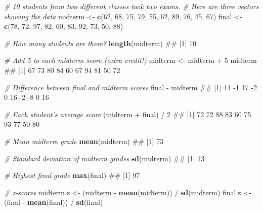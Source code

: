 \documentclass[]{book}
\newenvironment{Shaded}{\begin{snugshade}}{\end{snugshade}}
\newcommand{\KeywordTok}[1]{\textcolor[rgb]{0.13,0.29,0.53}{\textbf{{#1}}}}
\newcommand{\DecValTok}[1]{\textcolor[rgb]{0.00,0.00,0.81}{{#1}}}
\newcommand{\StringTok}[1]{\textcolor[rgb]{0.31,0.60,0.02}{{#1}}}
\newcommand{\CommentTok}[1]{\textcolor[rgb]{0.56,0.35,0.01}{\textit{{#1}}}}
\newcommand{\NormalTok}[1]{{#1}}
\theoremstyle{definition}
\theoremstyle{definition}
\theoremstyle{remark}
\begin{document}
\begin{Shaded}
\begin{Highlighting}[]
\CommentTok{# 10 students from two different classes took two exams.}
\CommentTok{#  Here are three vectors showing the data}
\NormalTok{midterm <-}\StringTok{ }\KeywordTok{c}\NormalTok{(}\DecValTok{62}\NormalTok{, }\DecValTok{68}\NormalTok{, }\DecValTok{75}\NormalTok{, }\DecValTok{79}\NormalTok{, }\DecValTok{55}\NormalTok{, }\DecValTok{62}\NormalTok{, }\DecValTok{89}\NormalTok{, }\DecValTok{76}\NormalTok{, }\DecValTok{45}\NormalTok{, }\DecValTok{67}\NormalTok{)}
\NormalTok{final <-}\StringTok{ }\KeywordTok{c}\NormalTok{(}\DecValTok{78}\NormalTok{, }\DecValTok{72}\NormalTok{, }\DecValTok{97}\NormalTok{, }\DecValTok{82}\NormalTok{, }\DecValTok{60}\NormalTok{, }\DecValTok{83}\NormalTok{, }\DecValTok{92}\NormalTok{, }\DecValTok{73}\NormalTok{, }\DecValTok{50}\NormalTok{, }\DecValTok{88}\NormalTok{)}

\CommentTok{# How many students are there?}
\KeywordTok{length}\NormalTok{(midterm)}
\NormalTok{## [1] 10}

\CommentTok{# Add 5 to each midterm score (extra credit!)}
\NormalTok{midterm <-}\StringTok{ }\NormalTok{midterm +}\StringTok{ }\DecValTok{5}
\NormalTok{midterm}
\NormalTok{##  [1] 67 73 80 84 60 67 94 81 50 72}

\CommentTok{# Difference between final and midterm scores}
\NormalTok{final -}\StringTok{ }\NormalTok{midterm}
\NormalTok{##  [1] 11 -1 17 -2  0 16 -2 -8  0 16}

\CommentTok{# Each student's average score}
\NormalTok{(midterm +}\StringTok{ }\NormalTok{final) /}\StringTok{ }\DecValTok{2}
\NormalTok{##  [1] 72 72 88 83 60 75 93 77 50 80}

\CommentTok{# Mean midterm grade}
\KeywordTok{mean}\NormalTok{(midterm)}
\NormalTok{## [1] 73}

\CommentTok{# Standard deviation of midterm grades}
\KeywordTok{sd}\NormalTok{(midterm)}
\NormalTok{## [1] 13}

\CommentTok{# Highest final grade}
\KeywordTok{max}\NormalTok{(final)}
\NormalTok{## [1] 97}

\CommentTok{# z-scores}
\NormalTok{midterm.z <-}\StringTok{ }\NormalTok{(midterm -}\StringTok{ }\KeywordTok{mean}\NormalTok{(midterm)) /}\StringTok{ }\KeywordTok{sd}\NormalTok{(midterm)}
\NormalTok{final.z <-}\StringTok{ }\NormalTok{(final -}\StringTok{ }\KeywordTok{mean}\NormalTok{(final)) /}\StringTok{ }\KeywordTok{sd}\NormalTok{(final)}
\end{Highlighting}
\end{Shaded}
\end{document}
